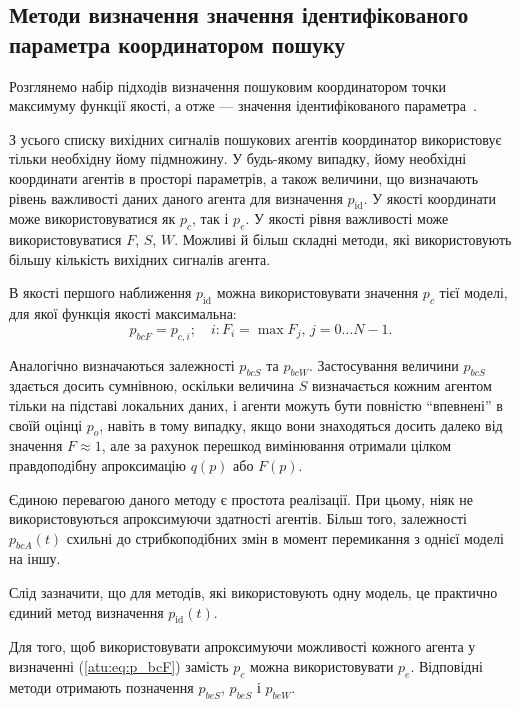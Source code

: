 \subsection{Методи визначення значення ідентифікованого параметра координатором пошуку} %


Розглянемо набір підходів визначення пошуковим координатором точки максимуму
функції якості, а отже --- значення ідентифікованого
параметра~\cite{atu_st99,atu_jacs2015,atu_st103}.


З усього списку вихідних сигналів пошукових агентів координатор використовує
тільки необхідну йому підмножину.
У будь-якому випадку, йому необхідні координати агентів в
просторі параметрів, а також величини, що визначають рівень
важливості даних даного агента для визначення
$ p_\mathrm{id} $.
У якості координати може використовуватися як $p_c$, так і $p_e$.
У якості рівня важливості може використовуватися $F$, $S$, $W$.
Можливі й більш складні методи, які використовують більшу
кількість вихідних сигналів агента.

В якості першого наближення $p_\mathrm{id}$ можна  використовувати
значення $p_c$ тієї моделі, для якої функція якості максимальна:
%
\begin{equation}
  p_{bcF}
  =
  p_{c,i};
  \quad
  i : F_i = \max{F_j}, \, j=0 \ldots N-1 .
  \label{atu:eq:p_bcF}
\end{equation}

Аналогічно визначаються залежності
$p_{bcS}$ та $p_{bcW}$.
%
Застосування величини
$ p_{bcS} $ здається досить сумнівною, оскільки величина
$S$ визначається кожним агентом тільки на підставі локальних
даних, і агенти можуть бути повністю ``впевнені'' в своїй оцінці
$ p_o $, навіть в тому випадку, якщо вони знаходяться досить далеко
від значення
$ F \approx 1 $, але за рахунок перешкод вимінювання отримали цілком
правдоподібну апроксимацію
$ q (p) $ або
$ F (p) $.

Єдиною перевагою даного методу є простота реалізації. При цьому, ніяк не
використовуються апроксимуючи здатності агентів. Більш того, залежності
$p_{bcA}(t)$ схильні до стрибкоподібних змін в момент перемикання з однієї моделі
на іншу.

Слід зазначити, що для методів, які використовують одну модель, це
практично єдиний метод визначення
$p_\mathrm{id}(t)$.

Для того, щоб використовувати апроксимуючи можливості кожного агента у
визначенні (\ref{atu:eq:p_bcF}) замість $p_c$ можна використовувати $ p_e$.
Відповідні методи отримають позначення $p_{beS}$, $p_{beS} $ і $p_{beW}$.


